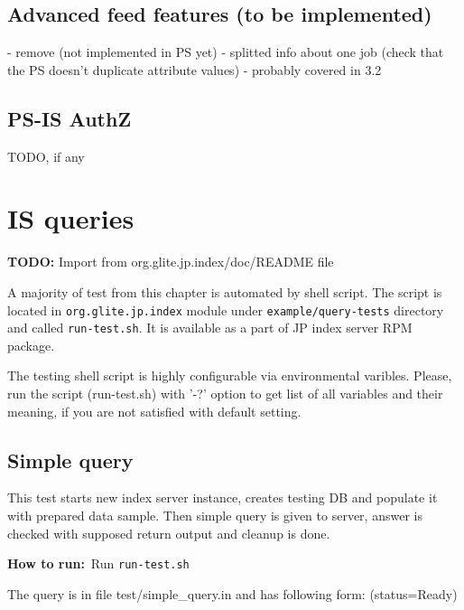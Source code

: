 \documentclass{egee}
\def\how{\noindent\textbf{How to run:}}
\def\todo#1{\textbf{TODO:} #1}
\begin{document}
\subsection{Advanced feed features (to be implemented)}
- remove (not implemented in PS yet)
- splitted info about one job (check that the PS doesn't duplicate
  attribute values) - probably covered in 3.2


\subsection{PS-IS AuthZ}
TODO, if any

\section{IS queries}
\todo{Import from org.glite.jp.index/doc/README file}


%
%
%

A majority of test from this chapter is automated by shell
script. The script is located in \texttt{org.glite.jp.index} module
under \texttt{example/query-tests} directory and called \texttt{run-test.sh}.
It is available as a part of JP index server RPM package.

\begin{hints}
The testing shell script is highly configurable via
environmental varibles.  Please, run the script (run-test.sh) with
'-?' option to get list of all variables and their meaning, if you are
not satisfied with default setting.
\end{hints}

\subsection{Simple query}
This test starts new index server instance, creates testing DB
and populate it with prepared data sample. Then simple query is given
to server, answer is checked with supposed return output and
cleanup is done.


\how\ Run \texttt{run-test.sh}

\begin{hints} 
The query is in file test/simple\_query.in and has following
  form: (status=Ready)
\end{hints}
\end{document}

